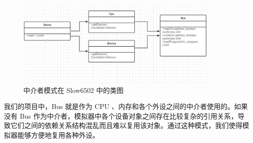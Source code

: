 \begin{figure}[h]
    \centering
    \includegraphics[width=0.9\textwidth]{figures/中介者模式.pdf}
    \caption{中介者模式在 Slow6502 中的类图}
\end{figure}

我们的项目中，Bus 就是作为 CPU 、内存和各个外设之间的中介者使用的。如果没有 Bus 作为中介者，模拟器中各个设备对象之间存在比较复杂的引用关系，导致它们之间的依赖关系结构混乱而且难以复用该对象。通过这种模式，我们使得模拟器能够方便地复用各种外设。

  